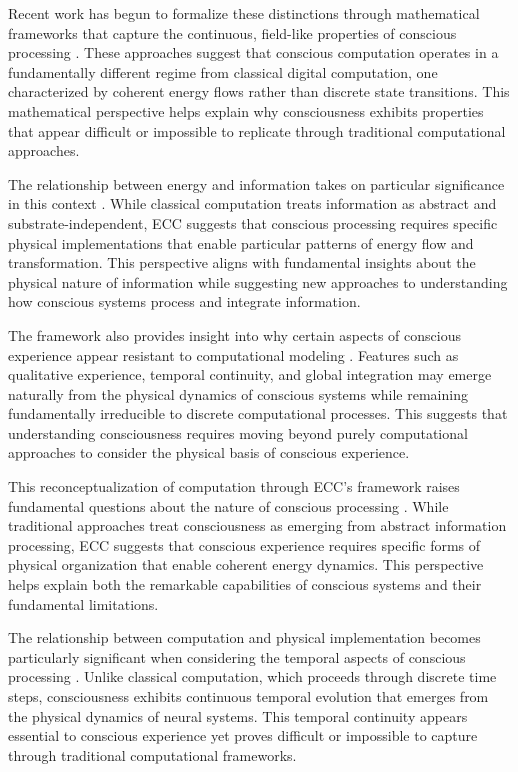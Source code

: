 \begin{refsection}
Recent work has begun to formalize these distinctions through mathematical frameworks that capture the continuous, field-like properties of conscious processing \cite{Siegelmann2003}. These approaches suggest that conscious computation operates in a fundamentally different regime from classical digital computation, one characterized by coherent energy flows rather than discrete state transitions. This mathematical perspective helps explain why consciousness exhibits properties that appear difficult or impossible to replicate through traditional computational approaches.

The relationship between energy and information takes on particular significance in this context \cite{Landauer1996}. While classical computation treats information as abstract and substrate-independent, ECC suggests that conscious processing requires specific physical implementations that enable particular patterns of energy flow and transformation. This perspective aligns with fundamental insights about the physical nature of information while suggesting new approaches to understanding how conscious systems process and integrate information.

The framework also provides insight into why certain aspects of conscious experience appear resistant to computational modeling \cite{Searle1990}. Features such as qualitative experience, temporal continuity, and global integration may emerge naturally from the physical dynamics of conscious systems while remaining fundamentally irreducible to discrete computational processes. This suggests that understanding consciousness requires moving beyond purely computational approaches to consider the physical basis of conscious experience.

This reconceptualization of computation through ECC's framework raises fundamental questions about the nature of conscious processing \cite{Wheeler1990}. While traditional approaches treat consciousness as emerging from abstract information processing, ECC suggests that conscious experience requires specific forms of physical organization that enable coherent energy dynamics. This perspective helps explain both the remarkable capabilities of conscious systems and their fundamental limitations.

The relationship between computation and physical implementation becomes particularly significant when considering the temporal aspects of conscious processing \cite{Deutsch2011}. Unlike classical computation, which proceeds through discrete time steps, consciousness exhibits continuous temporal evolution that emerges from the physical dynamics of neural systems. This temporal continuity appears essential to conscious experience yet proves difficult or impossible to capture through traditional computational frameworks.


\end{refsection}
